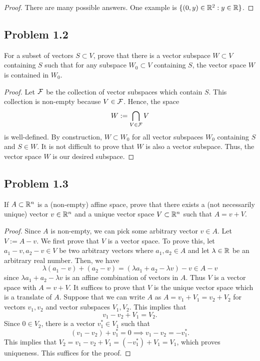 \documentclass[12pt]{article}
\begin{document}
\begin{proof}
	There are many possible answers. One example is $\{(0, y) \in \mathbb{R}^2 : y \in \mathbb{R}\}$.
\end{proof}

\newpage 

\subsection{Problem 1.2} 

\begin{problem}
	For a subset of vectors $S \subset V$, prove that there is a vector subspace $W \subset V$ containing $S$ such that for any subspace $W_0 \subset V$ containing $S$, the vector space $W$ is contained in $W_0$.  
\end{problem}

\begin{proof}
	Let $\mathcal{F}$ be the collection of vector subspaces which contain $S$. This collection is non-empty because $V \in \mathcal{F}$. Hence, the space
	\[
		W := \bigcap_{V \in \mathcal{F}} V
	\]
	is well-defined. By construction, $W \subset W_0$ for all vector subspaces $W_0$ containing $S$ and $S \in W$. It is not difficult to prove that $W$ is also a vector subspace. Thus, the vector space $W$ is our desired subspace. 
\end{proof}

\newpage 

\subsection{Problem 1.3}

\begin{problem}
	If $A \subset \mathbb{R}^n$ is a (non-empty) affine space, prove that there exists a (not necessarily unique) vector $v \in \mathbb{R}^n$ and a unique vector space $V \subset \mathbb{R}^n$ such that $A = v + V$. 
\end{problem}

\begin{proof}
	Since $A$ is non-empty, we can pick some arbitrary vector $v \in A$. Let $V := A - v$. We first prove that $V$ is a vector space. To prove this, let $a_1 - v, a_2 - v \in V$ be two arbitrary vectors where $a_1, a_2 \in A$ and let $\lambda \in \mathbb{R}$ be an arbitrary real number. Then, we have 
	\[
		\lambda (a_1 - v) + (a_2 - v) = (\lambda a_1 + a_2 - \lambda v) - v \in A - v
	\]
	since $\lambda a_1 + a_2 - \lambda v$ is an affine combination of vectors in $A$. Thus $V$ is a vector space with $A = v + V$. It suffices to prove that $V$ is the unique vector space which is a translate of $A$. Suppose that we can write $A$ as $A = v_1 + V_1 = v_2 + V_2$ for vectors $v_1, v_2$ and vector subspaces $V_1, V_2$. This implies that 
	\[
		v_1 - v_2 + V_1 = V_2. 
	\]
	Since $0 \in V_2$, there is a vector $v_1^* \in V_1$ such that 
	\[
		(v_1 - v_2) + v_1^* = 0 \implies v_1 - v_2 = -v_1^*.
	\]
	This implies that $V_2 = v_1 - v_2 + V_1 = (-v_1^*) + V_1 = V_1$, which proves uniqueness. This suffices for the proof. 
\end{proof}
\newpage 
\end{document}
